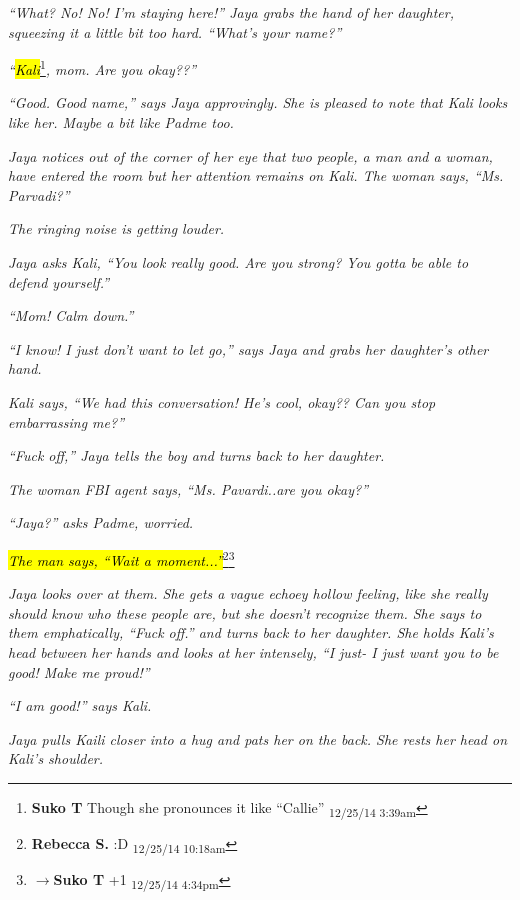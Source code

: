 \textit{``What?  No!  No!  I'm staying here!'' Jaya grabs the hand of her daughter, squeezing it a little bit  too hard.  ``What's your name?''}

\textit{``}\textit{\hl{Kali}}\footnote{\textbf{Suko T }Though she pronounces it like ``Callie'' \textsubscript{12/25/14 3:39am}}\textit{, mom.  Are you okay??''}

\textit{``Good.  Good name,'' says Jaya approvingly.  She is pleased to note that Kali looks like her.   Maybe a bit like Padme too.}

\textit{Jaya notices out of the corner of her eye that two people, a man and a woman, have entered the room but her attention remains on Kali.  The woman says, ``Ms. Parvadi?''}

\textit{The ringing noise is getting louder.}

\textit{Jaya asks Kali, ``You look really good.  Are you strong?  You gotta be able to defend yourself.'' }

\textit{``Mom!  Calm down.''}

\textit{``I know!  I just don't want to let go,'' says Jaya and grabs her daughter's other hand.}

\textit{Kali says, ``We had this conversation!  He's cool, okay??  Can you stop embarrassing me?''}

\textit{``Fuck off,'' Jaya tells the boy and turns back to her daughter.}

\textit{The woman FBI agent says, ``Ms. Pavardi..are you okay?''}

\textit{``Jaya?'' asks Padme, worried.}

\textit{\hl{The man says, ``Wait a moment...''}}\footnote{\textbf{Rebecca S. }:D \textsubscript{12/25/14 10:18am}}\footnote{$\rightarrow$\textbf{Suko T }+1 \textsubscript{12/25/14 4:34pm}}



\textit{Jaya looks over at them. She gets a vague echoey hollow feeling, like she really should know who these people are, but she doesn't recognize them.   She says to them emphatically, ``Fuck off.'' and turns back to her daughter. She holds Kali's head between her hands and looks at her intensely, ``I just- I just want you to be good!  Make me proud!''}

\textit{``I am good!'' says Kali.}

\textit{Jaya pulls Kaili closer into a hug and pats her on the back.  She rests her head on Kali's shoulder.}



